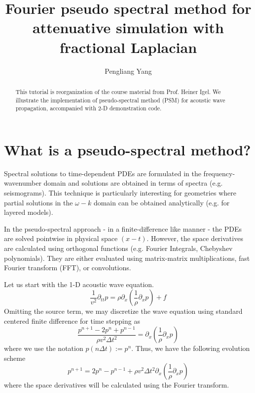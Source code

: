 \title{Fourier pseudo spectral method for attenuative simulation with fractional Laplacian}

\renewcommand{\thefootnote}{\fnsymbol{footnote}}
\author{Pengliang Yang}
\address{ISTerre, Univ. Grenoble Alpes}




\maketitle


\begin{abstract}
This tutorial is reorganization of the course material from Prof. Heiner Igel.
We illustrate the implementation of pseudo-spectral method (PSM) for acoustic wave propagation, accompanied with 2-D demonstration code.
\end{abstract}

\section{What is a pseudo-spectral method?}

Spectral solutions to time-dependent PDEs are formulated in the frequency-wavenumber domain and solutions are obtained in terms of spectra (e.g. seismograms). This
technique is particularly interesting for geometries where partial solutions in the $\omega-k$ domain can be obtained analytically (e.g. for layered models).

In the pseudo-spectral approach - in a finite-difference like manner - the PDEs are solved pointwise in physical space $(x-t)$. However, the space derivatives are calculated using
orthogonal functions (e.g. Fourier Integrals, Chebyshev polynomials). They are either evaluated using matrix-matrix multiplications, fast Fourier transform (FFT), or convolutions.

Let us start with the 1-D acoustic wave equation.
\begin{equation}
 \frac{1}{v^2}\partial_{tt}p=\rho\partial_x\left(\frac{1}{\rho}\partial_x p\right)+f
\end{equation}
Omitting the source term, we may discretize the wave equation using standard centered finite difference for time stepping as
\begin{equation} 
\frac{p^{n+1}-2p^n+p^{n-1}}{\rho v^2\Delta t^2}=\partial_x\left(\frac{1}{\rho}\partial_x p\right)
\end{equation}
where we use the notation $p(n\Delta t):=p^n$. Thus, we have the following evolution scheme
\begin{equation}
 p^{n+1}=2p^n-p^{n-1}+\rho v^2\Delta t^2 \partial_x\left(\frac{1}{\rho}\partial_x p\right)
\end{equation}
where the space derivatives will be calculated using the Fourier transform.

